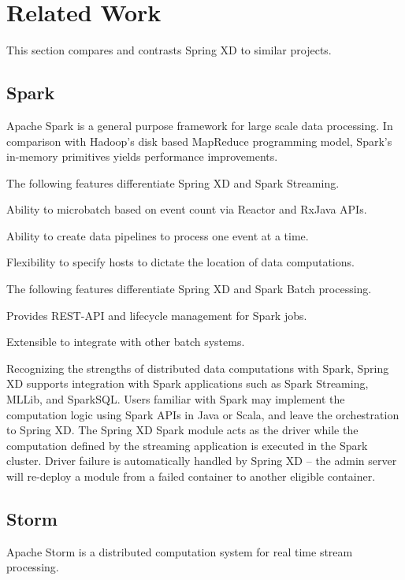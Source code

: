 \section{Related Work}
This section compares and contrasts Spring XD to similar projects.

\subsection{Spark}
\label{sec:Spark}
Apache Spark is a general purpose framework for large scale data processing.
In comparison with Hadoop's disk based MapReduce programming model, Spark's
in-memory primitives yields performance improvements.

The following features differentiate Spring XD and Spark Streaming.

\begin{itemize*}
\item Ability to microbatch based on event count via Reactor and RxJava APIs.
\item Ability to create data pipelines to process one event at a time.
\item Flexibility to specify hosts to dictate the location of data computations.
\end{itemize*}

The following features differentiate Spring XD and Spark Batch processing.

\begin{itemize*}
\item Provides REST-API and lifecycle management for Spark jobs.
\item Extensible to integrate with other batch systems.
\end{itemize*}

Recognizing the strengths of distributed data computations with Spark, Spring XD
supports integration with Spark applications such as Spark Streaming, MLLib, and
SparkSQL. Users familiar with Spark may implement the computation logic using
Spark APIs in Java or Scala, and leave the orchestration to Spring XD.
The Spring XD Spark module acts as the driver while the computation defined
by the streaming application is executed in the Spark cluster. Driver failure
is automatically handled by Spring XD -- the admin server will re-deploy a
module from a failed container to another eligible container.

\subsection{Storm}
Apache Storm\cite{storm} is a distributed computation system for real time stream
processing.

